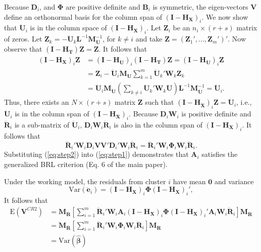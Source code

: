 \documentclass{article}\usepackage[]{graphicx}\usepackage[]{color}
\newcommand{\E}{\text{E}}
\newcommand{\Var}{\text{Var}}
\newcommand{\bm}{\mathbf}
\newcommand{\bs}{\boldsymbol}
\begin{document}
Because $\bm{D}_i$, and $\bs\Phi$ are positive definite and $\bm{B}_i$ is symmetric, the eigen-vectors $\bm{V}$ define an orthonormal basis for the column span of $\left(\bm{I} - \bm{H_X}\right)_i$.
We now show that $\bm{\ddot{U}}_i$ is in the column space of $\left(\bm{I} - \bm{H_X}\right)_i$. 
Let $\bm{Z}_i$ be an $n_i \times (r + s)$ matrix of zeros. 
Let $\bm{Z}_k = - \bm{\ddot{U}}_k \bm{L}^{-1}\bm{M}_{\bm{\ddot{U}}}^{-1}$, for $k \neq i$ and take $\bm{Z} = \left(\bm{Z}_1',...,\bm{Z}_m'\right)'$. 
Now observe that $\left(\bm{I} - \bm{H_T}\right) \bm{Z} = \bm{Z}$. 
It follows that 
\begin{align*}
\left(\bm{I} - \bm{H_X}\right)_i \bm{Z} &= \left(\bm{I} - \bm{H_{\ddot{U}}}\right)_i \left(\bm{I} - \bm{H_T}\right) \bm{Z} = \left(\bm{I} - \bm{H_{\ddot{U}}}\right)_i \bm{Z} \\
&= \bm{Z}_i - \bm{\ddot{U}}_i\bm{M_{\ddot{U}}}\sum_{k=1}^m \bm{\ddot{U}}_k'\bm{W}_k\bm{Z}_k \\
&= \bm{\ddot{U}}_i\bm{M_{\ddot{U}}} \left(\sum_{k \neq i} \bm{\ddot{U}}_k' \bm{W}_k \bm{\ddot{U}} \right) \bm{L}^{-1}\bm{M}_{\bm{\ddot{U}}}^{-1} = \bm{\ddot{U}}_i.
\end{align*}
Thus, there exists an $N \times (r + s)$ matrix $\bm{Z}$ such that $\left(\bm{I} - \bm{H_{\ddot{X}}}\right)_i \bm{Z} = \bm{\ddot{U}}_i$, i.e., $\bm{\ddot{U}}_i$ is in the column span of $\left(\bm{I} - \bm{H_X}\right)_i$. Because $\bm{D}_i \bm{W}_i$ is positive definite and $\bm{\ddot{R}}_i$ is a sub-matrix of $\bm{\ddot{U}}_i$, $\bm{D}_i\bm{W}_i\bm{\ddot{R}}_i$ is also in the column span of $\left(\bm{I} - \bm{H_X}\right)_i$. It follows that 
\begin{equation}
\label{eq:step2}
\bm{\ddot{R}}_i' \bm{W}_i \bm{D}_i \bm{V}\bm{V}' \bm{D}_i' \bm{W}_i \bm{\ddot{R}}_i = \bm{\ddot{R}}_i' \bm{W}_i \bs\Phi_i \bm{W}_i \bm{\ddot{R}}_i.
\end{equation}
Substituting (\ref{eq:step2}) into (\ref{eq:step1}) demonstrates that $\bm{A}_i$ satisfies the generalized BRL criterion (Eq. 6 of the main paper).

Under the working model, the residuals from cluster $i$ have mean $\bm{0}$ and variance \[
\Var\left(\bm{\ddot{e}}_i\right) = \left(\bm{I} - \bm{H_X}\right)_i \bs\Phi \left(\bm{I} - \bm{H_X}\right)_i',\] 
It follows that 
\begin{align*}
\E\left(\bm{V}^{CR2}\right) &= \bm{M_{\ddot{R}}}\left[\sum_{i=1}^m \bm{\ddot{R}}_i' \bm{W}_i \bm{A}_i \left(\bm{I} - \bm{H_X}\right)_i \bs\Phi \left(\bm{I} - \bm{H_X}\right)_i' \bm{A}_i \bm{W}_i \bm{\ddot{R}}_i \right] \bm{M_{\ddot{R}}} \\
&= \bm{M_{\ddot{R}}}\left[\sum_{i=1}^m \bm{\ddot{R}}_i' \bm{W}_i \bs\Phi_i \bm{W}_i \bm{\ddot{R}}_i \right] \bm{M_{\ddot{R}}} \\
&= \Var\left(\bs{\hat\beta}\right)
\end{align*}
\end{document}
